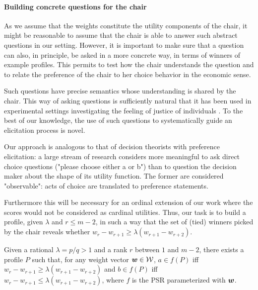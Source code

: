 \documentclass{article}
\begin{document}
\paragraph{Building concrete questions for the chair}
As we assume that the weights constitute the utility components of the chair, it might be reasonable to assume that the chair is able to answer such abstract questions in our setting. However, it is important to make sure that a question can also, in principle, be asked in a more concrete way, in terms of winners of example profiles. This permits to test how the chair understands the question and to relate the preference of the chair to her choice behavior in the economic sense. 

Such questions have precise semantics whose understanding is shared by the chair. This way of asking questions is sufficiently natural that it has been used in experimental settings investigating the feeling of justice of individuals \citep{Giritligil2005}. To the best of our knowledge, the use of such questions to systematically guide an elicitation process is novel.

Our approach is analogous to that of decision theorists with preference elicitation: a large stream of research considers more meaningful to ask direct choice questions ("please choose either a or b") than to question the decision maker about the shape of its utility function. The former are considered "observable": acts of choice are translated to preference statements.

Furthermore this will be necessary for an ordinal extension of our work where the scores would not be considered as cardinal utilities.
Thus, our task is to build a profile, given $\lambda$ and $r ≤ m-2$, in such a way that the set of (tied) winners picked by the chair reveals whether $w_{r} - w_{r+1} \geq \lambda (w_{r+1} - w_{r+2})$.
\begin{proposition}\label{prop:chairQuestions}
	Given a rational $\lambda = p/q > 1$ and a rank $r$ between $1$ and $m - 2$, there exists a profile $P$ such that, for any weight vector $\bm{w} \in \mathcal{W}$, $a \in f(P)$ iff $w_{r} - w_{r+1} ≥ \lambda (w_{r+1} - w_{r+2})$ and $b \in f(P)$ iff $w_{r} - w_{r+1} ≤ \lambda (w_{r+1} - w_{r+2})$, where $f$ is the PSR parameterized with $\bm{w}$.
\end{proposition}
\end{document}
